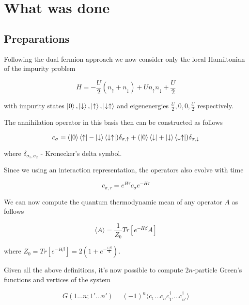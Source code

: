 \section{What was done}
\subsection{Preparations}
Following the dual fermion approach we now consider only the local Hamiltonian of the impurity problem

\begin{equation} H = -\frac{U}{2} \left(n_{\uparrow}+n_{\downarrow}\right) + U n_{\uparrow} n_{\downarrow} + \frac{U}{2} \end{equation}

with impurity states $\ket{0},\ket{\downarrow},\ket{\uparrow},\ket{\downarrow\uparrow}$ and eigenenergies $\frac{U}{2},0,0,\frac{U}{2}$ respectively.

The annihilation operator in this basis then can be constructed as follows

\begin{equation} c_\sigma =  	(\ket{0}\bra{\uparrow}-\ket{\downarrow}\bra{\downarrow\uparrow})\delta_{\sigma,\uparrow}
	+	(\ket{0}\bra{\downarrow}+\ket{\downarrow}\bra{\downarrow\uparrow})\delta_{\sigma,\downarrow} \end{equation}

where $\delta_{\sigma_1,\sigma_2}$ - Kronecker's delta symbol.

Since we using an interaction representation, the operators also evolve with time

\begin{equation} c_{\sigma,\tau} = e^{H\tau}c_\sigma e^{-H\tau} \end{equation}

We can now compute the quantum thermodynamic mean of any operator $A$ as follows

\begin{equation} \langle A\rangle = \frac{1}{Z_0}Tr[e^{-H\beta}A] \end{equation}

where $Z_0 = Tr[e^{-H\beta}] = 2(1+e^{-\frac{U\beta}{2}})$.

Given all the above definitions, it's now possible to compute $2n$-particle Green's functions and vertices of the system

\begin{equation} G(1\dots n;1'\dots n') = (-1)^n \langle c_1\dots c_n c_{1'}^\dagger\dots c_{n'}^\dagger\rangle\end{equation}

